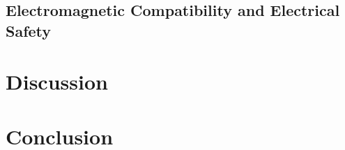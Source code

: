 \documentclass{article}
\begin{document}
\subsection{Electromagnetic Compatibility and Electrical Safety}

\section{Discussion}
\label{sec:discussion}

\section{Conclusion}
\label{sec:conclusion}


\newpage
{}


\end{document}

